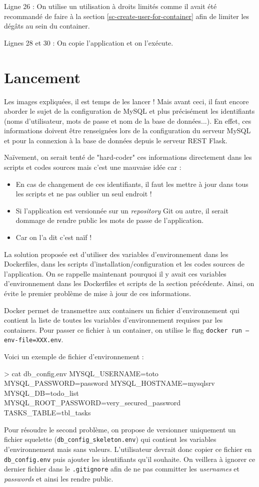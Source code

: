 \documentclass[11pt,a4paper,oneside]{report}
\newcommand{\code}[1]{\texttt{#1}}
\begin{document}
Ligne 26 : On utilise un utilisation à droits limités comme il avait été recommandé de faire à la section \ref{sc-create-user-for-container} afin de limiter les dégâts au sein du container.

Lignes 28 et 30 : On copie l'application et on l'exécute.

\section{Lancement}\label{sc-lancement}
Les images expliquées, il est temps de les lancer ! Mais avant ceci, il faut encore aborder le sujet de la configuration de MySQL et plus précisément les identifiants (noms d'utilisateur, mots de passe et nom de la base de données...). En effet, ces informations doivent être renseignées lors de la configuration du serveur MySQL et pour la connexion à la base de données depuis le serveur REST Flask.

Naïvement, on serait tenté de "hard-coder" ces informations directement dans les scripts et codes sources mais c'est une mauvaise idée car :
\begin{itemize}
\item En cas de changement de ces identifiants, il faut les mettre à jour dans tous les scripts et ne pas oublier un seul endroit !
\item Si l'application est versionnée sur un \textit{repository} Git ou autre, il serait dommage de rendre public les mots de passe de l'application.
\item Car on l'a dit c'est naïf !
\end{itemize}

La solution proposée est d'utiliser des variables d'environnement dans les Dockerfiles, dans les scripts d'installation/configuration et les codes sources de l'application. On se rappelle maintenant pourquoi il y avait ces variables d'environnement dans les Dockerfiles et scripts de la section précédente. Ainsi, on évite le premier problème de mise à jour de ces informations.

Docker permet de transmettre aux containers un fichier d'environnement qui contient la liste de toutes les variables d'environnement requises par les containers. Pour passer ce fichier à un container, on utilise le flag \code{docker run --env-file=XXX.env}.

Voici un exemple de fichier d'environnement :
\begin{bashcode}
> cat db_config.env
MYSQL_USERNAME=toto
MYSQL_PASSWORD=password
MYSQL_HOSTNAME=mysqlsrv
MYSQL_DB=todo_list
MYSQL_ROOT_PASSWORD=very_secured_password
TASKS_TABLE=tbl_tasks
\end{bashcode}
Pour résoudre le second problème, on propose de versionner uniquement un fichier squelette  \break(\code{db\_config\_skeleton.env}) qui contient les variables d'environnement mais sans valeurs. L'utilisateur devrait donc copier ce fichier en \code{db\_config.env} puis ajouter les identifiants qu'il souhaite. On veillera à ignorer ce dernier fichier dans le \code{.gitignore} afin de ne pas committer les \textit{usernames} et \textit{passwords} et ainsi les rendre public.
\end{document}
